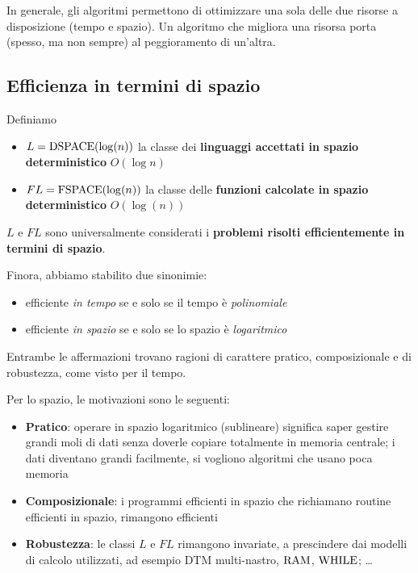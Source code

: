 In generale, gli algoritmi permettono di ottimizzare una sola delle due risorse a disposizione (tempo e spazio). Un algoritmo che migliora una risorsa porta (spesso, ma non sempre) al peggioramento di un'altra.

\subsection{Efficienza in termini di spazio}

Definiamo 
\begin{itemize}
	\item $L = \text{DSPACE} (\log (n))$ la classe dei \textbf{linguaggi accettati in spazio deterministico} $O(\log n)$
	
    \item $FL = \text{FSPACE} (\log (n))$ la classe delle \textbf{funzioni calcolate in spazio deterministico} $O(\log (n))$
\end{itemize}

$L$ e $FL$ sono universalmente considerati i \textbf{problemi risolti efficientemente in termini di spazio}.

Finora, abbiamo stabilito due sinonimie:
\begin{itemize}
	\item efficiente \textit{in tempo} se e solo se il tempo è \textit{polinomiale}
	\item efficiente \textit{in spazio} se e solo se lo spazio è \textit{logaritmico}
\end{itemize}

Entrambe le affermazioni trovano ragioni di carattere pratico, composizionale e di robustezza, come visto per il tempo.

Per lo spazio, le motivazioni sono le seguenti:
\begin{itemize}
	\item \textbf{Pratico}: operare in spazio logaritmico (sublineare) significa saper gestire grandi moli di dati senza doverle copiare totalmente in memoria centrale; i dati diventano grandi facilmente, si vogliono algoritmi che usano poca memoria 
    
	\item \textbf{Composizionale}: i programmi efficienti in spazio che richiamano routine efficienti in spazio, rimangono efficienti
    
	\item \textbf{Robustezza}: le classi $L$ e $FL$ rimangono invariate, a prescindere dai modelli di calcolo utilizzati, ad esempio DTM multi-nastro, $\text{RAM}$, $\text{WHILE}$; \dots
\end{itemize}

